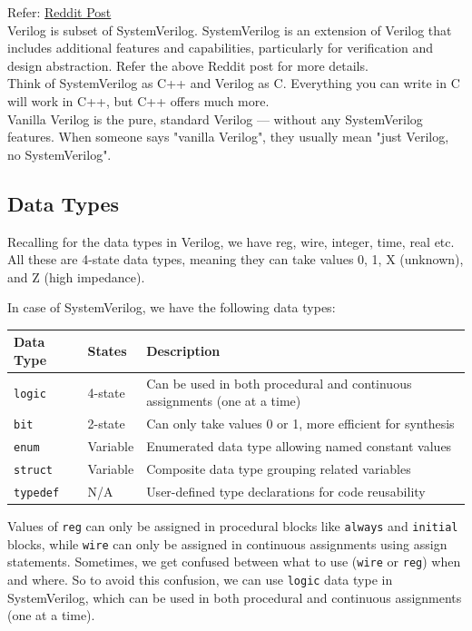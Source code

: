 \documentclass[12pt, a4paper]{article}
\begin{document}
Refer: \href{https://www.reddit.com/r/Verilog/comments/oqkcj5/difference_between_verilog_and_system_verilog/}{Reddit Post}\\ 

Verilog is subset of SystemVerilog. SystemVerilog is an extension of Verilog that includes additional features and capabilities, particularly for verification and design abstraction. Refer the above Reddit post for more details.\\

Think of SystemVerilog as C++ and Verilog as C. Everything you can write in C will work in C++, but C++ offers much more.\\

Vanilla Verilog is the pure, standard Verilog — without any SystemVerilog features. When someone says "vanilla Verilog", they usually mean "just Verilog, no SystemVerilog".


\subsection{Data Types}
Recalling for the data types in Verilog, we have reg, wire, integer, time, real etc. All these are 4-state data types, meaning they can take values 0, 1, X (unknown), and Z (high impedance).

In case of SystemVerilog, we have the following data types:

\begin{center}
\begin{tabular}{|l|l|p{}|}
\hline
\textbf{Data Type} & \textbf{States} & \textbf{Description} \\
\hline
\texttt{logic} & 4-state & Can be used in both procedural and continuous assignments (one at a time) \\
\hline
\texttt{bit} & 2-state & Can only take values 0 or 1, more efficient for synthesis \\
\hline
\texttt{enum} & Variable & Enumerated data type allowing named constant values \\
\hline
\texttt{struct} & Variable & Composite data type grouping related variables \\
\hline
\texttt{typedef} & N/A & User-defined type declarations for code reusability \\
\hline
\end{tabular}
\end{center}

Values of \texttt{reg} can only be assigned in procedural blocks like \texttt{always}  and \texttt{initial} blocks, while \texttt{wire} can only be assigned in continuous assignments using assign statements. Sometimes, we get confused between what to use (\texttt{wire} or \texttt{reg}) when and where. So to avoid this confusion, we can use  \texttt{logic} data type in SystemVerilog, which can be used in both procedural and continuous assignments (one at a time).
\end{document}
